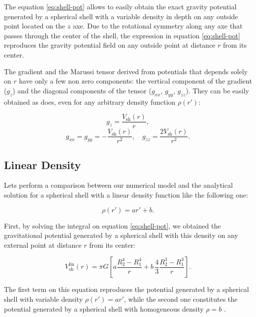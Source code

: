 \documentclass[extra]{gji}
\begin{document}
The equation \ref{eq:shell-pot} allows to easily obtain the exact
gravity potential generated by a spherical shell with a variable
density in depth on any outside point located on the $z$ axe.
Due to the rotational symmetry along any axe that passes through the
center of the shell, the expression in equation \ref{eq:shell-pot}
reproduces the gravity potential field on any outside point at distance
$r$ from its center.

The gradient and the Marussi tensor derived from potentials that
depends solely on $r$ have only a few non zero components: the vertical
component of the gradient ($g_z$) and the diagonal components of the
tensor ($g_{xx}$, $g_{yy}$, $g_{zz}$).
They can be easily obtained as \citet{Grombein2013} does, even for any
arbitrary density function $\rho(r')$:

\begin{equation}
    g_z = \frac{V_\text{sh}(r)}{r},
\end{equation}
\begin{equation}
    g_{xx} = g_{yy} = -\frac{V_\text{sh}(r)}{r^2}, \quad
    g_{zz} = \frac{2V_\text{sh}(r)}{r^2}.
\end{equation}


\subsection{Linear Density}

Lets perform a comparison between our numerical model and the
analytical solution for a spherical shell with a linear density
function like the following one:

\begin{equation}
    \rho(r') = ar' + b.
\end{equation}

First, by solving the integral on equation \ref{eq:shell-pot}, we obtained the
gravitational potential generated by a spherical shell with this density on
any external point at distance $r$ from its center:

\begin{equation}
    V_\text{sh}^\text{lin}(r) = \pi G \left[
    a \frac{R_2^4 - R_1^4}{r} +
    b \,\frac{4}{3} \frac{R_2^3 - R_1^3}{r} \right].
    \label{eq:shell-pot-linear}
\end{equation}

\noindent The first term on this equation reproduces the potential generated
by a spherical shell with variable density $\rho(r') = ar'$, while the second
one constitutes the potential generated by a spherical shell with homogeneous
density $\rho = b$ \citep{Mikuska2006,Grombein2013}.
\end{document}
